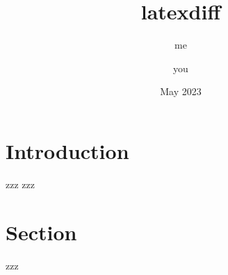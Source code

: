 \documentclass{article}
\title{latexdiff}
\author{me\and you}
\date{May 2023}
\begin{document}
\maketitle

\section{Introduction}
zzz zzz

\section{Section}
zzz
\cite{achiam2023gpt}


\end{document}
